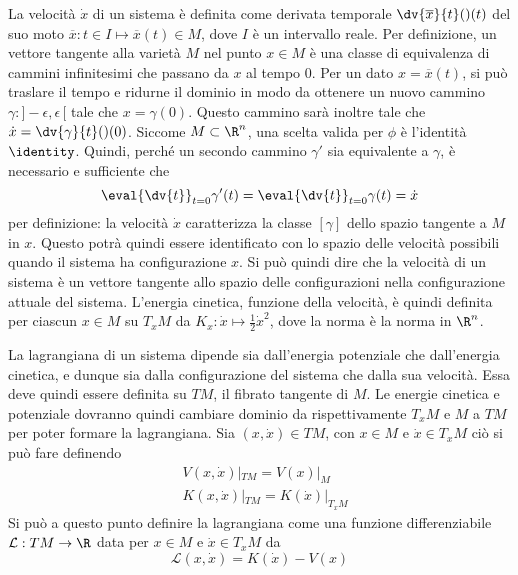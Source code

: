 La velocità $\dot{x}$ di un sistema è definita come derivata temporale $\dv{\overline{x}}{t}()(t)$ del suo moto $\overline{x}: t \in I \mapsto \overline{x}(t) \in M$, dove $I$ è un intervallo reale. Per definizione, un vettore tangente alla varietà $M$ nel punto $x \in M$ è una classe di equivalenza di cammini infinitesimi che passano da $x$ al tempo $0$. Per un dato $x =\overline{x}(t)$, si può traslare il tempo e ridurne il dominio in modo da ottenere un nuovo cammino $\gamma:]-\epsilon, \epsilon\,[$ tale che $x = \gamma(0)$. Questo cammino sarà inoltre tale che $\dot{x} = \dv{\gamma}{t}()(0)$. Siccome $M \subset \R^{n}$, una scelta valida per $\phi$ è l'identità $\identity$. Quindi, perché un secondo cammino $\gamma'$ sia equivalente a $\gamma$, è necessario e sufficiente che \begin{equation*}
\eval{\dv{t}}_{t=0} \gamma'(t) = \eval{\dv{t}}_{t=0} \gamma(t) = \dot{x}
\end{equation*}
per definizione: la velocità $\dot{x}$ caratterizza la classe $[\gamma]$ dello spazio tangente a $M$ in $x$. Questo potrà quindi essere identificato con lo spazio delle velocità possibili quando il sistema ha configurazione $x$. Si può quindi dire che la velocità di un sistema è un vettore tangente allo spazio delle configurazioni nella configurazione attuale del sistema. L'energia cinetica, funzione della velocità, è quindi definita per ciascun $x \in M$ su $T_x M$ da $K_x: \dot{x} \mapsto \frac{1}{2} \dot{x}^2$, dove la norma è la norma in $\R^{n}$.

La lagrangiana di un sistema dipende sia dall'energia potenziale che dall'energia cinetica, e dunque sia dalla configurazione del sistema che dalla sua velocità. Essa deve quindi essere definita su $TM$, il fibrato tangente di $M$. Le energie cinetica e potenziale dovranno quindi cambiare dominio da rispettivamente $T_x M$ e $M$ a $TM$ per poter formare la lagrangiana. Sia $(x,\dot{x}) \in TM$, con $x \in M$ e $\dot{x} \in T_x M$ ciò si può fare definendo \begin{equation*}
\begin{aligned}
  &V(x,\dot{x})|_{TM} = V(x)|_M \\
  &K(x, \dot{x})|_{TM} = K(\dot{x})|_{T_x M}
\end{aligned}
\end{equation*} 
Si può a questo punto definire la lagrangiana come una funzione differenziabile $\mathcal{L}:TM\to \R$ data per $x \in M$ e $\dot{x} \in T_x M$ da \begin{equation*}
\mathcal{L}(x,\dot{x}) = K(\dot{x}) - V(x)
\end{equation*}

